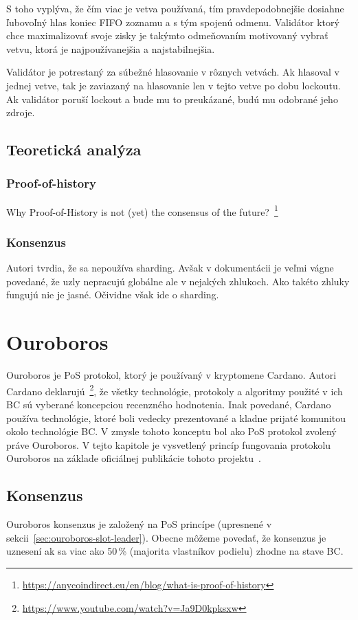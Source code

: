 S toho vyplýva, že čím viac je vetva používaná, tím pravdepodobnejšie dosiahne ľubovoľný hlas koniec FIFO zoznamu a s tým spojenú odmenu. Validátor ktorý chce maximalizovať svoje zisky je takýmto odmeňovaním motivovaný vybrať vetvu, ktorá je najpoužívanejšia a najstabilnejšia.

Validátor je potrestaný za súbežné hlasovanie v rôznych vetvách. Ak hlasoval v jednej vetve, tak je zaviazaný na hlasovanie len v tejto vetve po dobu lockoutu. Ak validátor poruší lockout a bude mu to preukázané, budú mu odobrané jeho zdroje.

\section{Teoretická analýza}\label{sec:solana-teor}

\subsection{Proof-of-history}

Why Proof-of-History is not (yet) the consensus of the future?~\footnote{\url{https://anycoindirect.eu/en/blog/what-is-proof-of-history}}

\subsection{Konsenzus}
Autori tvrdia, že sa nepoužíva sharding. Avšak v dokumentácii je veľmi vágne povedané, že uzly nepracujú globálne ale v nejakých zhlukoch. Ako takéto zhluky fungujú nie je jasné. Očividne však ide o sharding.

\chapter{Ouroboros}

Ouroboros je PoS protokol, ktorý je používaný v kryptomene Cardano. Autori Cardano deklarujú~\footnote{\url{https://www.youtube.com/watch?v=Ja9D0kpksxw}}, že všetky technológie, protokoly a algoritmy použité v ich BC sú vyberané koncepciou recenzného hodnotenia. Inak povedané, Cardano používa technológie, ktoré boli vedecky prezentované a kladne prijaté komunitou okolo technológie BC. V zmysle tohoto konceptu bol ako PoS protokol zvolený práve Ouroboros. V tejto kapitole je vysvetlený princíp fungovania protokolu Ouroboros na základe oficiálnej publikácie tohoto projektu~\cite{ouroborosWp}.

\section{Konsenzus}
Ouroboros konsenzus je založený na PoS princípe (upresnené v sekcii~\ref{sec:ouroboros-slot-leader}). Obecne môžeme povedať, že konsenzus je uznesení ak sa viac ako 50\,\% (majorita vlastníkov podielu) zhodne na stave BC.


